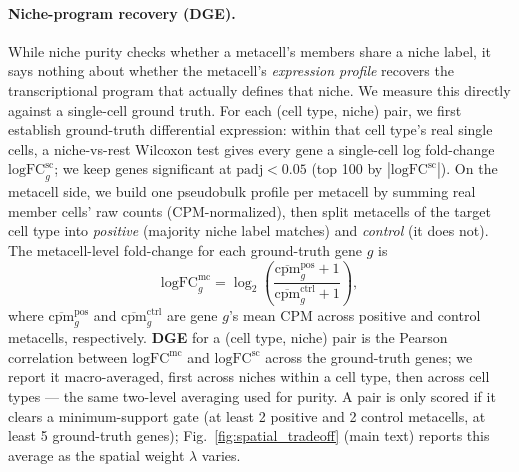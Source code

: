 \paragraph{Niche-program recovery (DGE).}
While niche purity checks whether a metacell's members share a niche label, it says nothing about whether the metacell's \emph{expression profile} recovers the transcriptional program that actually defines that niche. We measure this directly against a single-cell ground truth.
For each (cell type, niche) pair, we first establish ground-truth differential expression: within that cell type's real single cells, a niche-vs-rest Wilcoxon test gives every gene a single-cell log fold-change $\mathrm{logFC}^{\mathrm{sc}}_g$; we keep genes significant at $\mathrm{padj}<0.05$ (top 100 by $|\mathrm{logFC}^{\mathrm{sc}}|$).
On the metacell side, we build one pseudobulk profile per metacell by summing real member cells' raw counts (CPM-normalized), then split metacells of the target cell type into \emph{positive} (majority niche label matches) and \emph{control} (it does not). The metacell-level fold-change for each ground-truth gene $g$ is
\begin{equation}
\mathrm{logFC}^{\mathrm{mc}}_g = \log_2\!\left(\frac{\overline{\mathrm{cpm}}^{\mathrm{pos}}_g + 1}{\overline{\mathrm{cpm}}^{\mathrm{ctrl}}_g + 1}\right),
\end{equation}
where $\overline{\mathrm{cpm}}^{\mathrm{pos}}_g$ and $\overline{\mathrm{cpm}}^{\mathrm{ctrl}}_g$ are gene $g$'s mean CPM across positive and control metacells, respectively.
\textbf{DGE} for a (cell type, niche) pair is the Pearson correlation between $\mathrm{logFC}^{\mathrm{mc}}$ and $\mathrm{logFC}^{\mathrm{sc}}$ across the ground-truth genes; we report it macro-averaged, first across niches within a cell type, then across cell types --- the same two-level averaging used for purity.
A pair is only scored if it clears a minimum-support gate (at least 2 positive and 2 control metacells, at least 5 ground-truth genes); Fig.~\ref{fig:spatial_tradeoff} (main text) reports this average as the spatial weight $\lambda$ varies.

